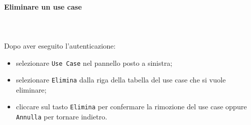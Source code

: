 	\paragraph{Eliminare un use case} \mbox{}\\ \mbox{}\\
	Dopo aver eseguito l'autenticazione:
	\begin{itemize}
		\item selezionare \texttt{Use Case} nel pannello posto a sinistra;
		\item selezionare \texttt{Elimina} dalla riga della tabella del use case 
		che si vuole eliminare;\
		\item cliccare sul tasto \texttt{Elimina} per confermare la rimozione del use case
		oppure \texttt{Annulla} per tornare indietro.
	\end{itemize}

	
